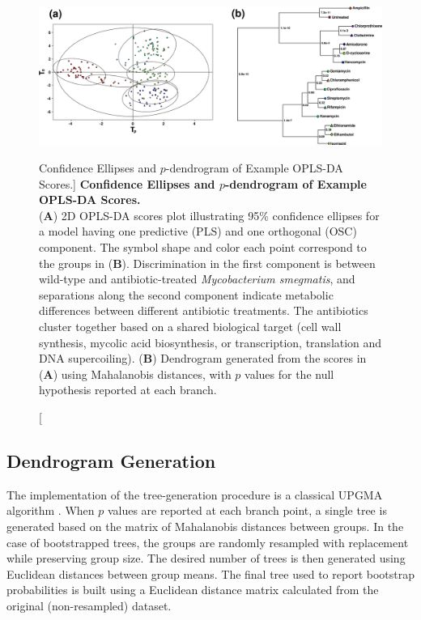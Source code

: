 \begin{figure}[ht!]
\includegraphics[width=6in]{figs/utils/01-opls.png}
\caption
      [Confidence Ellipses and $p$-dendrogram of Example OPLS-DA Scores.]{
  {\bf Confidence Ellipses and $p$-dendrogram of Example OPLS-DA Scores.}
  \\
  ({\bf A}) 2D OPLS-DA scores plot illustrating 95\% confidence ellipses for
  a model having one predictive (PLS) and one orthogonal (OSC) component. The
  symbol shape and color each point correspond to the groups in ({\bf B}).
  Discrimination in the first component is between wild-type and
  antibiotic-treated {\it Mycobacterium smegmatis}, and separations along the
  second component indicate metabolic differences between different antibiotic
  treatments. The antibiotics cluster together based on a shared biological
  target (cell wall synthesis, mycolic acid biosynthesis, or transcription,
  translation and DNA supercoiling). ({\bf B}) Dendrogram generated from the
  scores in ({\bf A}) using Mahalanobis distances, with $p$ values for the null
  hypothesis reported at each branch.
}
\label{figure.10.1}
\end{figure}

\subsection{Dendrogram Generation}

\begin{doublespace}
The implementation of the tree-generation procedure is a classical UPGMA
algorithm \cite{sokal:uksci1958}. When $p$ values are reported at
each branch point, a single tree is generated based on the matrix of
Mahalanobis distances between groups. In the case of bootstrapped trees, the
groups are randomly resampled with replacement while preserving group size.
The desired number of trees is then generated using Euclidean distances
between group means. The final tree used to report bootstrap probabilities
is built using a Euclidean distance matrix calculated from the original
(non-resampled) dataset.
\end{doublespace}

